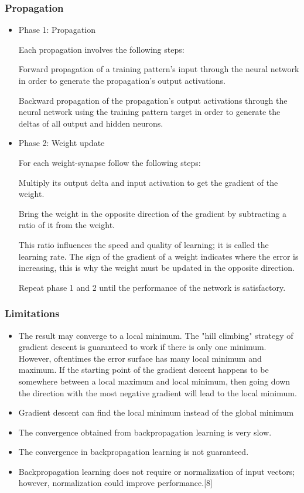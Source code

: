 \documentclass[a4paper,12pt]{article}
\begin{document}
\subsubsection{Propagation}
\begin{itemize}

 \item Phase 1: Propagation

Each propagation involves the following steps:

Forward propagation of a training pattern's input through the neural network in order to generate the propagation's output activations.

Backward propagation of the propagation's output activations through the neural network using the training pattern target in order to generate the deltas of all output and hidden neurons.

\item Phase 2: Weight update

For each weight-synapse follow the following steps:

Multiply its output delta and input activation to get the gradient of the weight.
    
Bring the weight in the opposite direction of the gradient by subtracting a ratio of it from the weight.

This ratio influences the speed and quality of learning; it is called the learning rate. The sign of the gradient of a weight indicates where the error is increasing, this is why the weight must be updated in the opposite direction.

Repeat phase 1 and 2 until the performance of the network is satisfactory.
\end{itemize}

\subsubsection{Limitations}

\begin{itemize}

 \item The result may converge to a local minimum. The "hill climbing" strategy of gradient descent is guaranteed to work if there is only one minimum. However, oftentimes the error surface has many local minimum and maximum. If the starting point of the gradient descent happens to be somewhere between a local maximum and local minimum, then going down the direction with the most negative gradient will lead to the local minimum.
    \item Gradient descent can find the local minimum instead of the global minimum
    \item The convergence obtained from backpropagation learning is very slow.
    \item The convergence in backpropagation learning is not guaranteed.
    \item Backpropagation learning does not require or normalization of input vectors; however, normalization could improve performance.[8]
\end{itemize}
\end{document}
